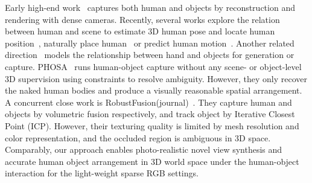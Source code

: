 %
Early high-end work~\cite{collet2015high} captures both human and objects by reconstruction and rendering with dense cameras. 
%
Recently, several works explore the relation between human and scene to estimate 3D human pose and locate human position~\cite{hassan2019resolving,HPS,liu20204d}, naturally place human~\cite{PSI2019,PLACE:3DV:2020,hassan2021populating} or predict human motion~\cite{cao2020long}. 
%
Another related direction~\cite{GRAB:2020,hampali2021handsformer,liu2021semi} models the relationship between hand and objects for generation or capture.
%
PHOSA~\cite{2020phosa_Arrangements} runs human-object capture without any scene- or object-level 3D supervision using constraints to resolve ambiguity. 
However, they only recover the naked human bodies and produce a visually reasonable spatial arrangement.
%
A concurrent close work is RobustFusion(journal)~\cite{su2021robustfusion}. They capture human and objects by volumetric fusion respectively, and track object by Iterative Closest Point (ICP). 
However, their texturing quality is limited by mesh resolution and color representation, and the occluded region is ambiguous in 3D space.
%
Comparably, our approach enables photo-realistic novel view synthesis and accurate human object arrangement in 3D world space
under the human-object interaction for the light-weight sparse RGB settings.